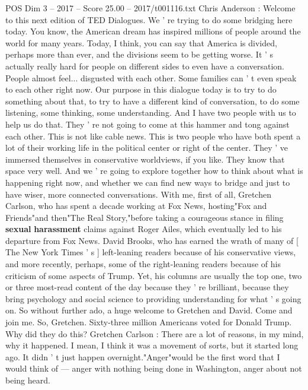 \begin{textsample}{POS Dim 3 – 2017 – Score 25.00 – 2017/t001116.txt}  \label{ex:f3_pos_011}
Chris Anderson : Welcome to this next edition of TED Dialogues.
We ' re trying to do some bridging here today.
You know, the American dream has inspired millions of people around the world for many years.
Today, I think, you can say that America is divided, perhaps more than ever, and the divisions seem to be getting worse.
It ' s actually really hard for people on different sides to even have a conversation.
People almost feel... disgusted with each other.
Some families can ' t even speak to each other right now.
Our purpose in this dialogue today is to try to do something about that, to try to have a different kind of conversation, to do some listening, some thinking, some understanding.
And I have two people with us to help us do that.
They ' re not going to come at this hammer and tong against each other.
This is not like cable news.
This is two people who have both spent a lot of their working life in the political center or right of the center.
They ' ve immersed themselves in conservative worldviews, if you like.
They know that space very well.
And we ' re going to explore together how to think about what is happening right now, and whether we can find new ways to bridge and just to have wiser, more connected conversations.
With me, first of all, Gretchen Carlson, who has spent a decade working at Fox News, hosting"Fox and Friends"and then"The Real Story,"before taking a courageous stance in filing \textbf{sexual} \textbf{harassment} claims against Roger Ailes, which eventually led to his departure from Fox News.
David Brooks, who has earned the wrath of many of [ The New York Times ' s ] left-leaning readers because of his conservative views, and more recently, perhaps, some of the right-leaning readers because of his criticism of some aspects of Trump.
Yet, his columns are usually the top one, two or three most-read content of the day because they ' re brilliant, because they bring psychology and social science to providing understanding for what ' s going on.
So without further ado, a huge welcome to Gretchen and David.
Come and join me.
So, Gretchen.
Sixty-three million Americans voted for Donald Trump.
Why did they do this?
Gretchen Carlson : There are a lot of reasons, in my mind, why it happened.
I mean, I think it was a movement of sorts, but it started long ago.
It didn ' t just happen overnight."Anger"would be the first word that I would think of — anger with nothing being done in Washington, anger about not being heard.

\end{textsample}
